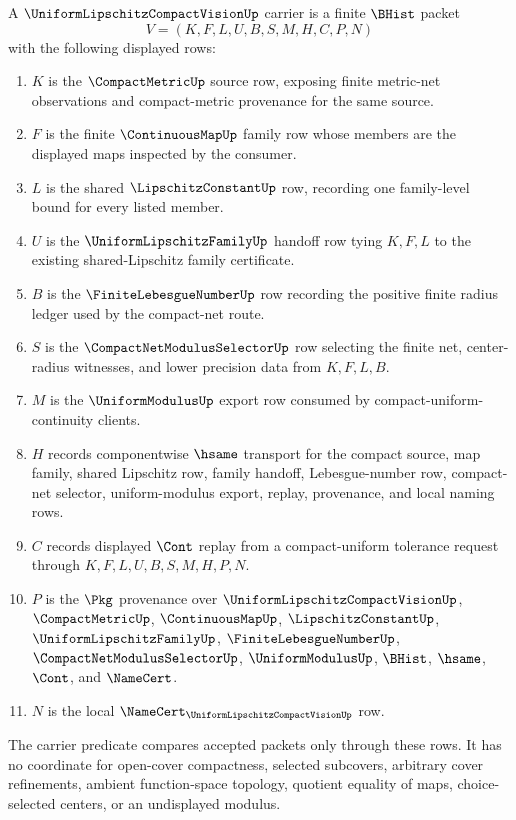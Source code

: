 \begin{definition}
\label{def:uniform-lipschitz-family-compact-vision-carrier}
A $\UniformLipschitzCompactVisionUp$ carrier is a finite $\BHist$ packet
$$
V=(K,F,L,U,B,S,M,H,C,P,N)
$$
with the following displayed rows:
\begin{enumerate}
\item $K$ is the $\CompactMetricUp$ source row, exposing finite metric-net observations and compact-metric provenance for the same source.
\item $F$ is the finite $\ContinuousMapUp$ family row whose members are the displayed maps inspected by the consumer.
\item $L$ is the shared $\LipschitzConstantUp$ row, recording one family-level bound for every listed member.
\item $U$ is the $\UniformLipschitzFamilyUp$ handoff row tying $K,F,L$ to the existing shared-Lipschitz family certificate.
\item $B$ is the $\FiniteLebesgueNumberUp$ row recording the positive finite radius ledger used by the compact-net route.
\item $S$ is the $\CompactNetModulusSelectorUp$ row selecting the finite net, center-radius witnesses, and lower precision data from $K,F,L,B$.
\item $M$ is the $\UniformModulusUp$ export row consumed by compact-uniform-continuity clients.
\item $H$ records componentwise $\hsame$ transport for the compact source, map family, shared Lipschitz row, family handoff, Lebesgue-number row, compact-net selector, uniform-modulus export, replay, provenance, and local naming rows.
\item $C$ records displayed $\Cont$ replay from a compact-uniform tolerance request through $K,F,L,U,B,S,M,H,P,N$.
\item $P$ is the $\Pkg$ provenance over $\UniformLipschitzCompactVisionUp$, $\CompactMetricUp$, $\ContinuousMapUp$, $\LipschitzConstantUp$, $\UniformLipschitzFamilyUp$, $\FiniteLebesgueNumberUp$, $\CompactNetModulusSelectorUp$, $\UniformModulusUp$, $\BHist$, $\hsame$, $\Cont$, and $\NameCert$.
\item $N$ is the local $\NameCert_{\UniformLipschitzCompactVisionUp}$ row.
\end{enumerate}
The carrier predicate compares accepted packets only through these rows. It has no coordinate for open-cover compactness, selected subcovers, arbitrary cover refinements, ambient function-space topology, quotient equality of maps, choice-selected centers, or an undisplayed modulus.
\end{definition}

